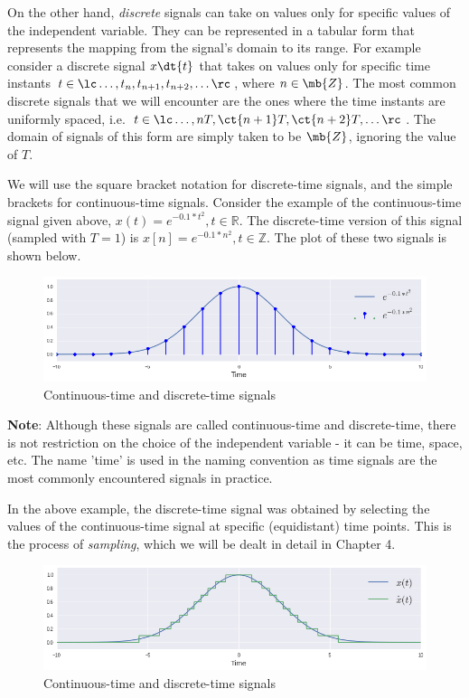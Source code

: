 On the other hand, \textit{discrete} signals can take on values only for specific values of the independent variable. They can be represented in a tabular form that represents the mapping from the signal's domain to its range. For example consider a discrete signal $x\dt{t}$ that takes on values only for specific time instants $t \in \lc \ldots, t_{n}, t_{n+1}, t_{n+2}, \ldots \rc$, where $n \in \mb{Z}$. The most common discrete signals that we will encounter are the ones where the time instants are uniformly spaced, i.e. $t \in \lc \ldots, nT, \ct{n+1}T, \ct{n+2}T, \ldots \rc$. The domain of signals of this form are simply taken to be $\mb{Z}$, ignoring the value of $T$.

We will use the square bracket notation for discrete-time signals, and the simple brackets for continuous-time signals. Consider the example of the continuous-time signal given above, $x\left(t\right) = e^{-0.1*t^{2}}, t \in \mathbb{R}$. The discrete-time version of this signal (sampled with $T = 1$) is $x\left[n\right] = e^{-0.1*n^{2}}, t \in \mathbb{Z}$. The plot of these two signals is shown below.

\begin{figure}[h]
\centering
    \includegraphics[width=\textwidth]{figs/stem-plot.png}
\caption{Continuous-time and discrete-time signals} \label{fig:ch1_stem}
\end{figure}

\vspace{0.2cm}
{\small \color{black!70!} \noindent\textbf{Note}: Although these signals are called continuous-time and discrete-time, there is not restriction on the choice of the independent variable - it can be time, space, etc. The name 'time' is used in the naming convention as time signals are the most commonly encountered signals in practice.}

In the above example, the discrete-time signal was obtained by selecting the values of the continuous-time signal at specific (equidistant) time points. This is the process of \textit{sampling}, which we will be dealt in detail in Chapter 4.

\begin{figure}[h]
\centering
    \includegraphics[width=\textwidth]{figs/quantization-plot.png}
\caption{Continuous-time and discrete-time signals} \label{fig:ch1_quant}
\end{figure}

